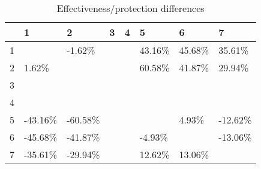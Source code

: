 \begin{table}[ht]
\centering
\begin{tabular}{rlllllll}
  \hline
 & 1 & 2 & 3 & 4 & 5 & 6 & 7 \\ 
  \hline
1 &  & -1.62\% &  &  & 43.16\% & 45.68\% & 35.61\% \\ 
  2 & 1.62\% &  &  &  & 60.58\% & 41.87\% & 29.94\% \\ 
  3 &  &  &  &  &  &  &  \\ 
  4 &  &  &  &  &  &  &  \\ 
  5 & -43.16\% & -60.58\% &  &  &  & 4.93\% & -12.62\% \\ 
  6 & -45.68\% & -41.87\% &  &  & -4.93\% &  & -13.06\% \\ 
  7 & -35.61\% & -29.94\% &  &  & 12.62\% & 13.06\% &  \\ 
   \hline
\end{tabular}
\caption{Effectiveness/protection differences} 
\end{table}

